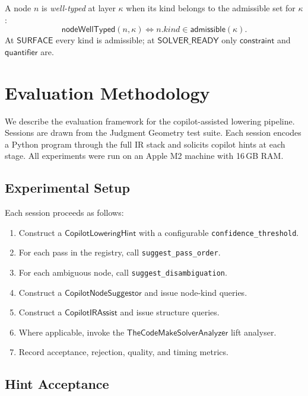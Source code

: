 \documentclass[11pt]{article}
\newcommand{\CLH}{\mathsf{CopilotLoweringHint}}
\newcommand{\CNS}{\mathsf{CopilotNodeSuggestor}}
\newcommand{\CIA}{\mathsf{CopilotIRAssist}}
\newcommand{\TCA}{\mathsf{TheCodeMakeSolverAnalyzer}}
\newcommand{\Surface}{\mathsf{SURFACE}}
\newcommand{\SolverReady}{\mathsf{SOLVER\_READY}}
\begin{document}
\begin{definition}\label{def:node-wt}
A node $n$ is \emph{well-typed} at layer $\kappa$ when its kind
belongs to the admissible set for $\kappa$:
\[
  \mathsf{nodeWellTyped}(n, \kappa) \iff n.\mathit{kind} \in
  \mathsf{admissible}(\kappa).
\]
At $\Surface$ every kind is admissible; at $\SolverReady$ only
$\mathsf{constraint}$ and $\mathsf{quantifier}$ are.
\end{definition}

\section{Evaluation Methodology}\label{sec:experiments}

We describe the evaluation framework for the copilot-assisted lowering
pipeline.  Sessions are drawn from the Judgment Geometry test
suite.  Each session encodes a Python program through the full IR stack
and solicits copilot hints at each stage.  All experiments were run on
an Apple M2 machine with 16\,GB RAM.

\subsection{Experimental Setup}\label{sec:exp-setup}

Each session proceeds as follows:
\begin{enumerate}
\item Construct a $\CLH$ with a configurable
  \texttt{confidence\_threshold}.
\item For each pass in the registry, call
  \texttt{suggest\_pass\_order}.
\item For each ambiguous node, call \texttt{suggest\_disambiguation}.
\item Construct a $\CNS$ and issue
  node-kind queries.
\item Construct a $\CIA$ and issue
  structure queries.
\item Where applicable, invoke the $\TCA$ lift analyser.
\item Record acceptance, rejection, quality, and timing metrics.
\end{enumerate}

\subsection{Hint Acceptance}\label{sec:exp-accept}
\end{document}
